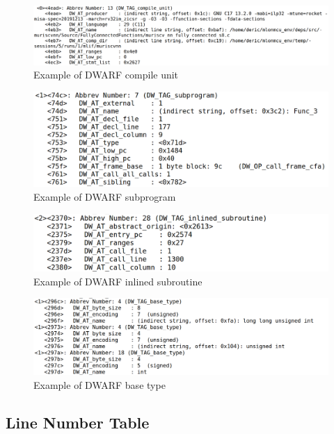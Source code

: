 \begin{figure}
    \centering
    \includegraphics[width=.9\linewidth]{figures/DWARF_compile_unit.png}
    \caption{Example of DWARF compile unit}
    \label{fig:dwarf_compile_unit}
\end{figure}

\begin{figure}
    \centering
    \includegraphics[width=.75\linewidth]{figures/DWARF_subprogram.png}
    \caption{Example of DWARF subprogram}
    \label{fig:dwarf_subprogram}
\end{figure}

\begin{figure}
    \centering
    \includegraphics[width=.75\linewidth]{figures/DWARF_inlined_subroutine.png}
    \caption{Example of DWARF inlined subroutine}
    \label{fig:dwarf_inlined_subroutine}
\end{figure}

\begin{figure}
    \centering
    \includegraphics[width=.75\linewidth]{figures/DWARF_base_type.png}
    \caption{Example of DWARF base type}
    \label{fig:dwarf_base_type}
\end{figure}

\subsection{Line Number Table}
\label{subsec:line_table}

